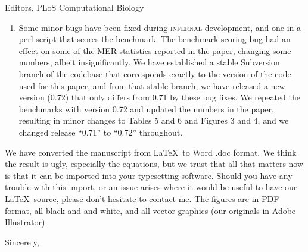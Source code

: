\documentclass{jfrcletter}
\begin{document}
\begin{letter}{Editors, PLoS Computational Biology}
\begin{enumerate}
\item Some minor bugs have been fixed during \textsc{infernal}
     development, and one in a perl script that scores the
     benchmark. The benchmark scoring bug had an effect on some of the
     MER statistics reported in the paper, changing some numbers,
     albeit insignificantly.  We have established a stable Subversion
     branch of the codebase that corresponds exactly to the version of
     the code used for this paper, and from that stable branch, we
     have released a new version (0.72) that only differs from 0.71 by
     these bug fixes. We repeated the benchmarks with version 0.72 and
     updated the numbers in the paper, resulting in minor changes to
     Tables 5 and 6 and Figures 3 and 4, and we changed release
     ``0.71'' to ``0.72'' throughout.
\end{enumerate}


We have converted the manuscript from \LaTeX\ to Word .doc format. We
think the result is ugly, especially the equations, but we trust that
all that matters now is that it can be imported into your typesetting
software. Should you have any trouble with this import, or an issue
arises where it would be useful to have our \LaTeX\ source, please
don't hesitate to contact me. The figures are in PDF format, all black
and and white, and all vector graphics (our originals in Adobe
Illustrator).

\closing{Sincerely,}

\end{letter}
\end{document}
